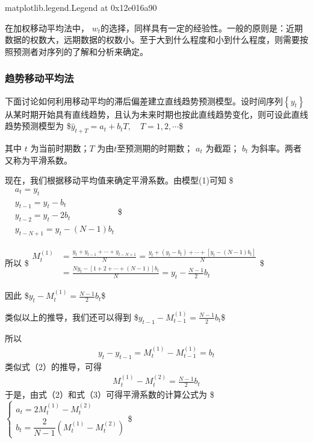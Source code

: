 \documentclass[letterpaper,10pt,english]{sphinxmanual}
\begin{document}
\begin{sphinxVerbatim}[commandchars=\\\{\}]
\PYGZlt{}matplotlib.legend.Legend at 0x12e016a90\PYGZgt{}
\end{sphinxVerbatim}

\noindent{}

在加权移动平均法中， \(w_t\)的选择，同样具有一定的经验性。一般的原则是：近期数据的权数大，远期数据的权数小。至于大到什么程度和小到什么程度，则需要按照预测者对序列的了解和分析来确定。


\subsubsection{趋势移动平均法}
\label{\detokenize{docs/prediction_model:id14}}
下面讨论如何利用移动平均的滞后偏差建立直线趋势预测模型。设时间序列\(\left\{y_{t}\right\}\)从某时期开始具有直线趋势，且认为未来时期也按此直线趋势变化，则可设此直线趋势预测模型为
\$\(
\hat{y}_{t+T}=a_{t}+b_{t} T, \quad T=1,2, \cdots 
\tag{1}
\)\$

其中 \(t\) 为当前时期数；\(T\) 为由\(t\)至预测期的时期数； \(a_t\) 为截距； \(b_t\) 为斜率。两者又称为平滑系数。

现在，我们根据移动平均值来确定平滑系数。由模型(1)可知
\$\(
\begin{aligned}
&a_{t}=y_{t}\\
&y_{t-1}=y_{t}-b_{t}\\
&y_{t-2}=y_{t}-2 b_{t}\\
&y_{t-N+1}=y_{t}-(N-1) b_{t}
\end{aligned}
\)\$

所以
\$\(
\begin{aligned}
M_{t}^{(1)} &=\frac{y_{t}+y_{t-1}+\cdots+y_{t-N+1}}{N}=\frac{y_{t}+\left(y_{t}-b_{t}\right)+\cdots+\left[y_{t}-(N-1) b_{t}\right]}{N} \\
&=\frac{N y_{t}-[1+2+\cdots+(N-1)] b_{t}}{N}=y_{t}-\frac{N-1}{2} b_{t}
\end{aligned}
\)\$

因此
\$\(
y_{t}-M_{t}^{(1)}=\frac{N-1}{2} b_{t}
\tag{2}
\)\$

类似以上的推导，我们还可以得到
\$\(
y_{t-1}-M_{t-1}^{(1)}=\frac{N-1}{2} b_{t}
\)\$

所以
\begin{equation*}
\begin{split}
y_{t}-y_{t-1}=M_{t}^{(1)}-M_{t-1}^{(1)}=b_{t}
\end{split}
\end{equation*}
类似式（2）的推导，可得
\begin{equation*}
\begin{split}
M_{t}^{(1)}-M_{t}^{(2)}=\frac{N-1}{2} b_{t}
\tag{3}
\end{split}
\end{equation*}
于是，由式（2）和式（3）可得平滑系数的计算公式为
\$\(
\left\{\begin{array}{l}
{a_{t}=2 M_{t}^{(1)}-M_{t}^{(2)}} \\
{b_{t}=\dfrac{2}{N-1}\left(M_{t}^{(1)}-M_{t}^{(2)}\right)}
\end{array}\right.
\)\$
\end{document}
